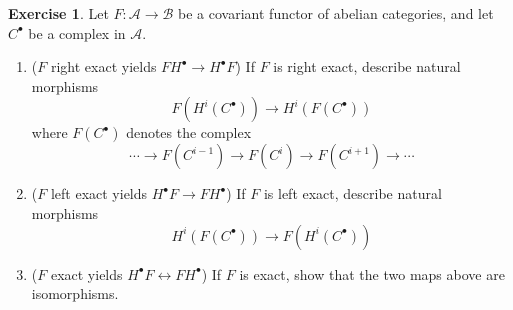 \documentclass[psamsfonts]{amsart}
\theoremstyle{definition}
\newtheorem{exer}[thm]{Exercise}
\theoremstyle{remark}
\begin{document}
\begin{exer}
Let $F: \mathscr{A} \to \mathscr{B}$ be a covariant functor of abelian categories, and let $C^\bullet$ be a complex in $\mathscr{A}$.
\begin{enumerate}
\item ($F$ right exact yields $FH^\bullet \to H^\bullet F$) If $F$ is right exact, describe natural morphisms 
$$F(H^i(C^\bullet)) \to H^i(F(C^\bullet))$$
where $F(C^\bullet)$ denotes the complex
$$\cdots \to F(C^{i-1}) \to F(C^i) \to F(C^{i+1}) \to \cdots $$
\item ($F$ left exact yields $H^\bullet F \to FH^\bullet$) If $F$ is left exact, describe natural morphisms
$$H^i(F(C^\bullet)) \to F(H^i(C^\bullet)) $$
\item ($F$ exact yields $H^\bullet F \leftrightarrow FH^\bullet$) If $F$ is exact, show that the two maps above are isomorphisms.
\end{enumerate}
\end{exer}
\end{document}
